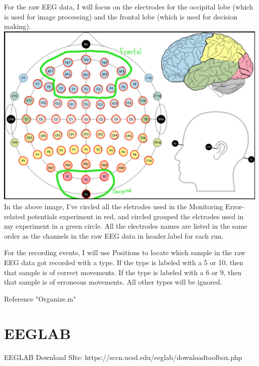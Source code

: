 \documentclass[12pt]{article}
\begin{document}
For the raw EEG data, I will focus on the electrodes for the occipital lobe (which is used for image processing) and the frontal lobe (which is used for decision making).\newline
\includegraphics[scale=0.4]{ElectrodePlacements}\newline
In the above image, I've circled all the eletrodes used in the Monitoring Error-related potentials experiment in red, and circled grouped the elctrodes used in my experiment in a green circle. All the electrodes names are listed in the same order as the channels in the raw EEG data in header.label for each run. 

For the recording events, I will use Positions to locate which sample in the raw EEG data got recorded with a type. If the type is labeled with a 5 or 10, then that sample is of correct movements. If the type is labeled with a 6 or 9, then that sample is of erroneous movements. All other types will be ignored.

Reference "Organize.m"

\section{EEGLAB}
EEGLAB Download SIte: https://sccn.ucsd.edu/eeglab/downloadtoolbox.php
\end{document}
